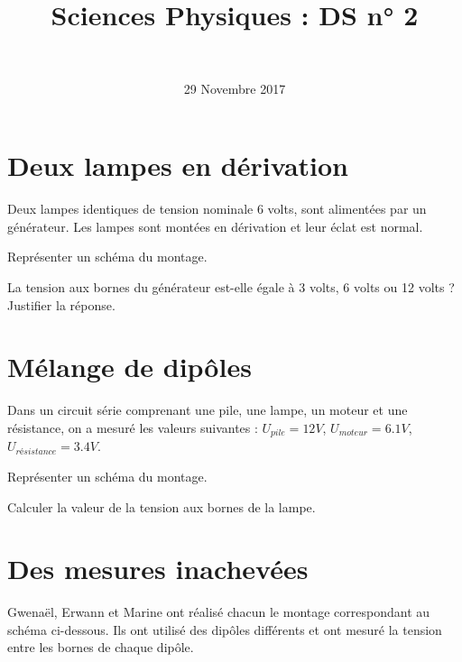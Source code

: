 \documentclass[a4paper,11pt]{exam}
\author{\ }
\date{29 Novembre 2017}
\title{Sciences Physiques : DS n° 2}
\begin{document}
%	

	\maketitle
\vspace*{-0.5cm}	
\section{Deux lampes en dérivation}

Deux lampes identiques de tension nominale 6 volts, sont alimentées par un générateur. Les lampes sont montées en dérivation et leur éclat est normal.

\begin{questions}
	\question Représenter un schéma du montage.
	
	\makeemptybox{5cm}
	
	\question La tension aux bornes du générateur est-elle égale à 3 volts, 6 volts ou 12 volts ? Justifier la réponse.
	
	\fillwithdottedlines{2cm}
\end{questions}

\section{Mélange de dipôles}

Dans un circuit série comprenant une pile, une lampe, un moteur et une résistance, on a mesuré les valeurs suivantes : $U_{pile}= 12 V$, $U_{moteur}= \num{6.1} V$, $U_{résistance}= \num{3.4} V$.

\begin{questions}
	\question Représenter un schéma du montage.
	
	\makeemptybox{5cm}
	
	\question Calculer la valeur de la tension aux bornes de la lampe.
	\fillwithdottedlines{2cm}
\end{questions}

\section{Des mesures inachevées}

Gwenaël, Erwann et Marine ont réalisé chacun le montage correspondant au schéma ci-dessous. Ils ont utilisé des dipôles différents et ont mesuré la tension entre les bornes de chaque dipôle.
\end{document}
